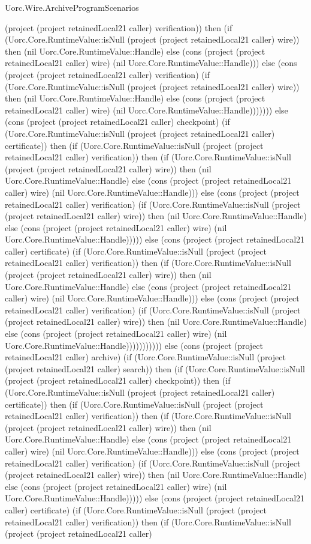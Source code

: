\begin{lexlean}{Uorc.Wire.ArchiveProgramScenarios}
\begin{semanticmodule}
{(project (project retainedLocal21 caller) verification)) then (if (Uorc.Core.RuntimeValue::isNull (project (project retainedLocal21 caller) wire)) then (nil Uorc.Core.RuntimeValue::Handle) else (cons (project (project retainedLocal21 caller) wire) (nil Uorc.Core.RuntimeValue::Handle))) else (cons (project (project retainedLocal21 caller) verification) (if (Uorc.Core.RuntimeValue::isNull (project (project retainedLocal21 caller) wire)) then (nil Uorc.Core.RuntimeValue::Handle) else (cons (project (project retainedLocal21 caller) wire) (nil Uorc.Core.RuntimeValue::Handle))))))) else (cons (project (project retainedLocal21 caller) checkpoint) (if (Uorc.Core.RuntimeValue::isNull (project (project retainedLocal21 caller) certificate)) then (if (Uorc.Core.RuntimeValue::isNull (project (project retainedLocal21 caller) verification)) then (if (Uorc.Core.RuntimeValue::isNull (project (project retainedLocal21 caller) wire)) then (nil Uorc.Core.RuntimeValue::Handle) else (cons (project (project retainedLocal21 caller) wire) (nil Uorc.Core.RuntimeValue::Handle))) else (cons (project (project retainedLocal21 caller) verification) (if (Uorc.Core.RuntimeValue::isNull (project (project retainedLocal21 caller) wire)) then (nil Uorc.Core.RuntimeValue::Handle) else (cons (project (project retainedLocal21 caller) wire) (nil Uorc.Core.RuntimeValue::Handle))))) else (cons (project (project retainedLocal21 caller) certificate) (if (Uorc.Core.RuntimeValue::isNull (project (project retainedLocal21 caller) verification)) then (if (Uorc.Core.RuntimeValue::isNull (project (project retainedLocal21 caller) wire)) then (nil Uorc.Core.RuntimeValue::Handle) else (cons (project (project retainedLocal21 caller) wire) (nil Uorc.Core.RuntimeValue::Handle))) else (cons (project (project retainedLocal21 caller) verification) (if (Uorc.Core.RuntimeValue::isNull (project (project retainedLocal21 caller) wire)) then (nil Uorc.Core.RuntimeValue::Handle) else (cons (project (project retainedLocal21 caller) wire) (nil Uorc.Core.RuntimeValue::Handle))))))))))) else (cons (project (project retainedLocal21 caller) archive) (if (Uorc.Core.RuntimeValue::isNull (project (project retainedLocal21 caller) search)) then (if (Uorc.Core.RuntimeValue::isNull (project (project retainedLocal21 caller) checkpoint)) then (if (Uorc.Core.RuntimeValue::isNull (project (project retainedLocal21 caller) certificate)) then (if (Uorc.Core.RuntimeValue::isNull (project (project retainedLocal21 caller) verification)) then (if (Uorc.Core.RuntimeValue::isNull (project (project retainedLocal21 caller) wire)) then (nil Uorc.Core.RuntimeValue::Handle) else (cons (project (project retainedLocal21 caller) wire) (nil Uorc.Core.RuntimeValue::Handle))) else (cons (project (project retainedLocal21 caller) verification) (if (Uorc.Core.RuntimeValue::isNull (project (project retainedLocal21 caller) wire)) then (nil Uorc.Core.RuntimeValue::Handle) else (cons (project (project retainedLocal21 caller) wire) (nil Uorc.Core.RuntimeValue::Handle))))) else (cons (project (project retainedLocal21 caller) certificate) (if (Uorc.Core.RuntimeValue::isNull (project (project retainedLocal21 caller) verification)) then (if (Uorc.Core.RuntimeValue::isNull (project (project retainedLocal21 caller) }
\end{semanticmodule}
\end{lexlean}
